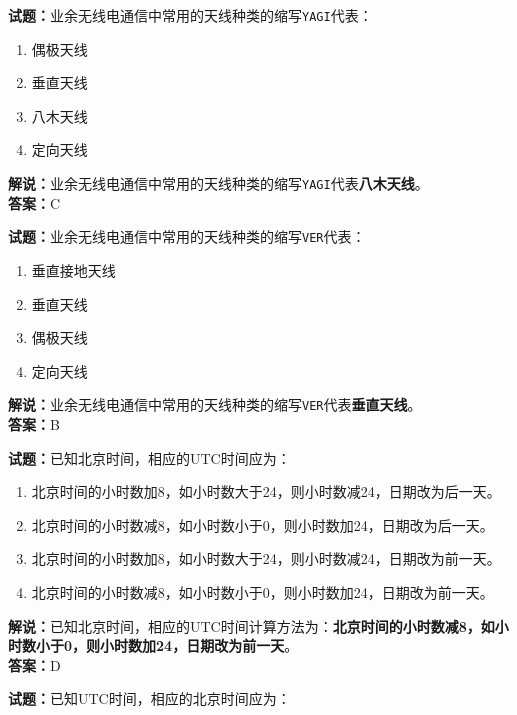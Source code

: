 \documentclass{ctexbook}
\begin{document}
\noindent\textbf{试题：}业余无线电通信中常用的天线种类的缩写\texttt{YAGI}代表：

\begin{enumerate}[leftmargin=3em]
	\item 偶极天线
	\item 垂直天线
	\item 八木天线
	\item 定向天线
\end{enumerate}

\noindent\textbf{解说：}业余无线电通信中常用的天线种类的缩写\texttt{YAGI}代表\textbf{八木天线}。\\\noindent\textbf{答案：}C


\bigskip


\noindent\textbf{试题：}业余无线电通信中常用的天线种类的缩写\texttt{VER}代表：

\begin{enumerate}[leftmargin=3em]
	\item 垂直接地天线
	\item 垂直天线
	\item 偶极天线
	\item 定向天线
\end{enumerate}

\noindent\textbf{解说：}业余无线电通信中常用的天线种类的缩写\texttt{VER}代表\textbf{垂直天线}。\\\noindent\textbf{答案：}B


\bigskip


\noindent\textbf{试题：}已知北京时间，相应的UTC时间应为：

\begin{enumerate}[leftmargin=3em]
	\item 北京时间的小时数加8，如小时数大于24，则小时数减24，日期改为后一天。
	\item 北京时间的小时数减8，如小时数小于0，则小时数加24，日期改为后一天。
	\item 北京时间的小时数加8，如小时数大于24，则小时数减24，日期改为前一天。
	\item 北京时间的小时数减8，如小时数小于0，则小时数加24，日期改为前一天。
\end{enumerate}

\noindent\textbf{解说：}已知北京时间，相应的UTC时间计算方法为：\textbf{北京时间的小时数减8，如小时数小于0，则小时数加24，日期改为前一天}。\\\noindent\textbf{答案：}D


\bigskip


\noindent\textbf{试题：}已知UTC时间，相应的北京时间应为：
\end{document}
